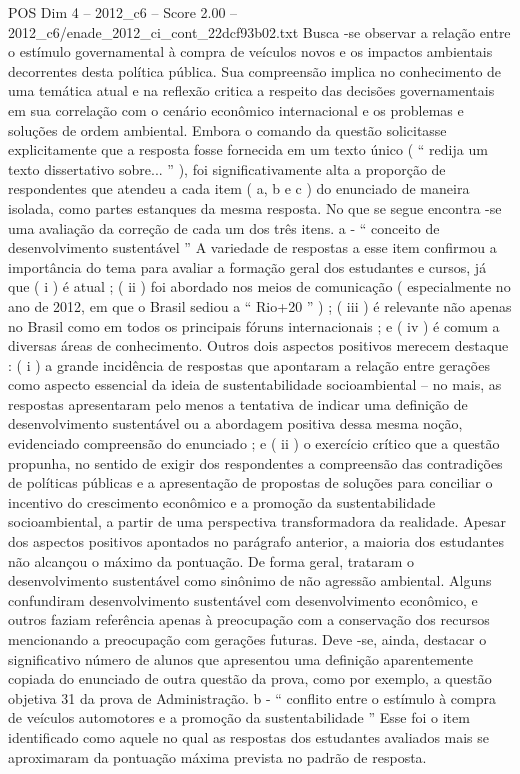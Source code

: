 \begin{textsample}{POS Dim 4 – 2012\_c6 – Score 2.00 – 2012\_c6/enade\_2012\_ci\_cont\_22dcf93b02.txt}
Busca -se observar a relação entre o estímulo governamental à compra de veículos novos e os impactos ambientais decorrentes desta política pública.
Sua compreensão implica no conhecimento de uma temática atual e na reflexão critica a respeito das decisões governamentais em sua correlação com o cenário econômico internacional e os problemas e soluções de ordem ambiental.
Embora o comando da questão solicitasse explicitamente que a resposta fosse fornecida em um texto único ( “ redija um texto dissertativo sobre... ” ), foi significativamente alta a proporção de respondentes que atendeu a cada item ( a, b e c ) do enunciado de maneira isolada, como partes estanques da mesma resposta.
No que se segue encontra -se uma avaliação da correção de cada um dos três itens. a - “ conceito de desenvolvimento sustentável ” A variedade de respostas a esse item confirmou a importância do tema para avaliar a formação geral dos estudantes e cursos, já que ( i ) é atual ; ( ii ) foi abordado nos meios de comunicação ( especialmente no ano de 2012, em que o Brasil sediou a “ Rio+20 ” ) ; ( iii ) é relevante não apenas no Brasil como em todos os principais fóruns internacionais ; e ( iv ) é comum a diversas áreas de conhecimento.
Outros dois aspectos positivos merecem destaque : ( i ) a grande incidência de respostas que apontaram a relação entre gerações como aspecto essencial da ideia de sustentabilidade socioambiental – no mais, as respostas apresentaram pelo menos a tentativa de indicar uma definição de desenvolvimento sustentável ou a abordagem positiva dessa mesma noção, evidenciado compreensão do enunciado ; e ( ii ) o exercício crítico que a questão propunha, no sentido de exigir dos respondentes a compreensão das contradições de políticas públicas e a apresentação de propostas de soluções para conciliar o incentivo do crescimento econômico e a promoção da sustentabilidade socioambiental, a partir de uma perspectiva transformadora da realidade.
Apesar dos aspectos positivos apontados no parágrafo anterior, a maioria dos estudantes não alcançou o máximo da pontuação.
De forma geral, trataram o desenvolvimento sustentável como sinônimo de não agressão ambiental.
Alguns confundiram desenvolvimento sustentável com desenvolvimento econômico, e outros faziam referência apenas à preocupação com a conservação dos recursos mencionando a preocupação com gerações futuras.
Deve -se, ainda, destacar o significativo número de alunos que apresentou uma definição aparentemente copiada do enunciado de outra questão da prova, como por exemplo, a questão objetiva 31 da prova de Administração. b - “ conflito entre o estímulo à compra de veículos automotores e a promoção da sustentabilidade ” Esse foi o item identificado como aquele no qual as respostas dos estudantes avaliados mais se aproximaram da pontuação máxima prevista no padrão de resposta.

\end{textsample}

